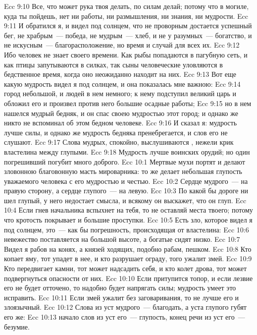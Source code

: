 \vs Ecc 9:10 Все, что может рука твоя делать, по силам делай; потому что в могиле, куда ты пойдешь, нет ни работы, ни размышления, ни знания, ни мудрости.
\rsbpar\vs Ecc 9:11 И обратился я, и видел под солнцем, что не проворным достается успешный бег, не храбрым~--- победа, не мудрым~--- хлеб, и не у разумных~--- богатство, и не искусным~--- благорасположение, но время и случай для всех их.
\vs Ecc 9:12 Ибо человек не знает своего времени. Как рыбы попадаются в пагубную сеть, и как птицы запутываются в силках, так сыны человеческие уловляются в бедственное время, когда оно неожиданно находит на них.
\rsbpar\vs Ecc 9:13 Вот еще какую мудрость видел я под солнцем, и она показалась мне важною:
\vs Ecc 9:14 город небольшой, и людей в нем немного; к нему подступил великий царь и обложил его и произвел против него большие осадные работы;
\vs Ecc 9:15 но в нем нашелся мудрый бедняк, и он спас своею мудростью этот город; и однако же никто не вспоминал об этом бедном человеке.
\vs Ecc 9:16 И сказал я: мудрость лучше силы, и однако же мудрость бедняка пренебрегается, и слов его не слушают.
\vs Ecc 9:17 Слова мудрых,  спокойно, выслушиваются , нежели крик властелина между глупыми.
\vs Ecc 9:18 Мудрость лучше воинских орудий; но один погрешивший погубит много доброго.
\vs Ecc 10:1 Мертвые мухи портят и делают зловонною благовонную масть мироварника: то же делает небольшая глупость уважаемого человека с его мудростью и честью.
\vs Ecc 10:2 Сердце мудрого~--- на правую сторону, а сердце глупого~--- на левую.
\vs Ecc 10:3 По какой бы дороге ни шел глупый, у него  недостает смысла, и всякому он выскажет, что он глуп.
\vs Ecc 10:4 Если гнев начальника вспыхнет на тебя, то не оставляй места твоего; потому что кротость покрывает и большие проступки.
\rsbpar\vs Ecc 10:5 Есть зло, которое видел я под солнцем, это~--- как бы погрешность, происходящая от властелина:
\vs Ecc 10:6 невежество поставляется на большой высоте, а богатые сидят низко.
\vs Ecc 10:7 Видел я рабов на конях, а князей ходящих, подобно рабам, пешком.
\vs Ecc 10:8 Кто копает яму, тот упадет в нее, и кто разрушает ограду, того ужалит змей.
\vs Ecc 10:9 Кто передвигает камни, тот может надсадить себя, и кто колет дрова, тот может подвергнуться опасности от них.
\vs Ecc 10:10 Если притупится топор, и если лезвие его не будет отточено, то надобно будет напрягать силы; мудрость умеет это исправить.
\vs Ecc 10:11 Если змей ужалит без заговаривания, то не лучше его и злоязычный.
\vs Ecc 10:12 Слова из уст мудрого~--- благодать, а уста глупого губят его же:
\vs Ecc 10:13 начало слов из уст его~--- глупость,  конец речи из уст его~--- безумие.
